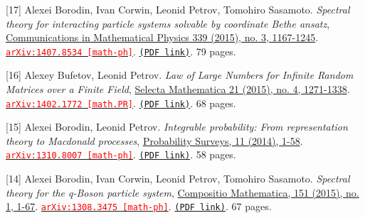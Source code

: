 \begin{etaremune}
\item[{[17]}] 
Alexei Borodin, Ivan Corwin, Leonid Petrov, Tomohiro Sasamoto.
\emph{Spectral theory for interacting particle systems solvable by coordinate Bethe ansatz}, \href{https://link.springer.com/article/10.1007%2Fs00220-015-2424-7}{Communications in Mathematical Physics 339 (2015), no. 3, 1167-1245}. 
\href{https://arxiv.org/abs/1407.8534}{\texttt{{\textcolor{red}{arXiv:1407.8534 [math-ph]}}}}. \href{https://storage.lpetrov.cc/papers/17-spectral_theory_for.pdf}{\texttt{(PDF link)}}. 79 pages.





\item[{[16]}] 
Alexey Bufetov, Leonid Petrov.
\emph{Law of Large Numbers for Infinite Random Matrices over a Finite Field}, \href{https://link.springer.com/article/10.1007/s00029-015-0179-9}{Selecta Mathematica 21 (2015), no. 4, 1271-1338}. 
\href{https://arxiv.org/abs/1402.1772}{\texttt{{\textcolor{red}{arXiv:1402.1772 [math.PR]}}}}. \href{https://storage.lpetrov.cc/papers/16-law_of_large.pdf}{\texttt{(PDF link)}}. 68 pages.













\item[{[15]}] 
Alexei Borodin, Leonid Petrov.
\emph{Integrable probability: From representation theory to Macdonald processes}, \href{http://www.i-journals.org/ps/viewarticle.php?id=225&layout=abstract}{Probability Surveys, 11 (2014), 1-58}. 
\href{https://arxiv.org/abs/1310.8007}{\texttt{{\textcolor{red}{arXiv:1310.8007 [math-ph]}}}}. \href{https://storage.lpetrov.cc/papers/15-integrable_probability_from.pdf}{\texttt{(PDF link)}}. 58 pages.





\item[{[14]}] 
Alexei Borodin, Ivan Corwin, Leonid Petrov, Tomohiro Sasamoto.
\emph{Spectral theory for the q-Boson particle system}, \href{https://www.cambridge.org/core/journals/compositio-mathematica/article/spectral-theory-for-the-qboson-particle-system/2A1C9C46E1C39E10D9436697F5593D86}{Compositio Mathematica, 151 (2015), no. 1, 1-67}. 
\href{https://arxiv.org/abs/1308.3475}{\texttt{{\textcolor{red}{arXiv:1308.3475 [math-ph]}}}}. \href{https://storage.lpetrov.cc/papers/14-spectral_theory_for.pdf}{\texttt{(PDF link)}}. 67 pages.




\end{etaremune}
